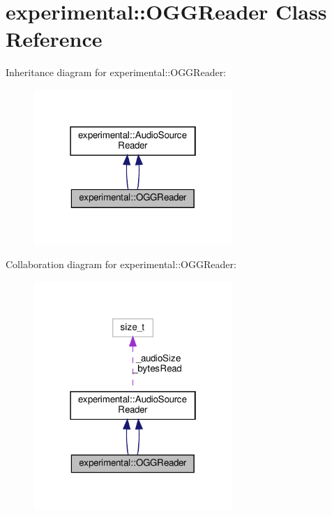 \hypertarget{classexperimental_1_1OGGReader}{}\section{experimental\+:\+:O\+G\+G\+Reader Class Reference}
\label{classexperimental_1_1OGGReader}


Inheritance diagram for experimental\+:\+:O\+G\+G\+Reader\+:
\nopagebreak
\begin{figure}[H]
\begin{center}
\leavevmode
\includegraphics[width=214pt]{classexperimental_1_1OGGReader__inherit__graph}
\end{center}
\end{figure}


Collaboration diagram for experimental\+:\+:O\+G\+G\+Reader\+:
\nopagebreak
\begin{figure}[H]
\begin{center}
\leavevmode
\includegraphics[width=214pt]{classexperimental_1_1OGGReader__coll__graph}
\end{center}
\end{figure}
